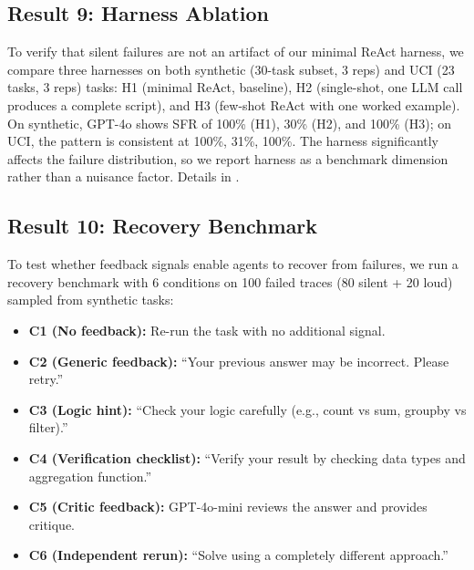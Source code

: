 \FloatBarrier

\subsection{Result 9: Harness Ablation}
\label{sec:res-harness}

To verify that silent failures are not an artifact of our minimal ReAct harness, we compare three harnesses on both synthetic (30-task subset, 3 reps) and UCI (23 tasks, 3 reps) tasks: H1 (minimal ReAct, baseline), H2 (single-shot, one LLM call produces a complete script), and H3 (few-shot ReAct with one worked example). On synthetic, GPT-4o shows SFR of 100\% (H1), 30\% (H2), and 100\% (H3); on UCI, the pattern is consistent at 100\%, 31\%, 100\%. The harness significantly affects the failure distribution, so we report harness as a benchmark dimension rather than a nuisance factor. Details in .

\FloatBarrier

\subsection{Result 10: Recovery Benchmark}
\label{sec:res-recovery-bench}

To test whether feedback signals enable agents to recover from failures, we run a recovery benchmark with 6 conditions on 100 failed traces (80 silent + 20 loud) sampled from synthetic tasks:

\begin{itemize}[leftmargin=*,itemsep=1pt]
\item \textbf{C1 (No feedback):} Re-run the task with no additional signal.
\item \textbf{C2 (Generic feedback):} ``Your previous answer may be incorrect. Please retry.''
\item \textbf{C3 (Logic hint):} ``Check your logic carefully (e.g., count vs sum, groupby vs filter).''
\item \textbf{C4 (Verification checklist):} ``Verify your result by checking data types and aggregation function.''
\item \textbf{C5 (Critic feedback):} GPT-4o-mini reviews the answer and provides critique.
\item \textbf{C6 (Independent rerun):} ``Solve using a completely different approach.''
\end{itemize}

